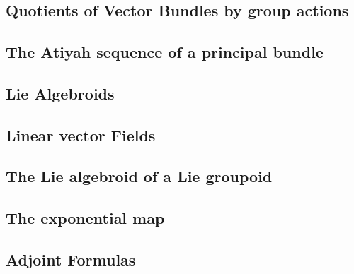 \chapter{}

\section{Quotients of Vector Bundles by group actions}

\section{The Atiyah sequence of a principal bundle}

\section{Lie Algebroids}

\section{Linear vector Fields}

\section{The Lie algebroid of a Lie groupoid}

\section{The exponential map}

\section{Adjoint Formulas}